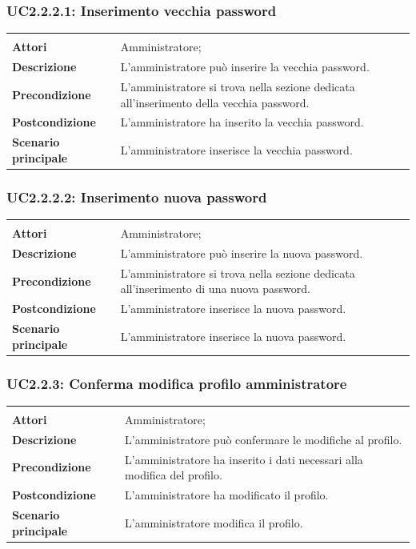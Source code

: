 \subsubsection{UC2.2.2.1: Inserimento vecchia password}
\label{UC2.2.2.1}
\begin{longtable}{l|p{10cm}}
\hline
&\\
\textbf{Attori} & Amministratore;\\[7pt]
\textbf{Descrizione} & L'amministratore può inserire la vecchia password.\\[7pt]
\textbf{Precondizione} & L'amministratore si trova nella sezione dedicata all'inserimento della vecchia password.\\[7pt]
\textbf{Postcondizione} & L'amministratore ha inserito la vecchia password.\\[7pt]
\textbf{Scenario principale} & L'amministratore inserisce la vecchia password.\\[7pt]\hline
\end{longtable}

\subsubsection{UC2.2.2.2: Inserimento nuova password}
\label{UC2.2.2.2}
\begin{longtable}{l|p{10cm}}
\hline
&\\
\textbf{Attori} & Amministratore;\\[7pt]
\textbf{Descrizione} & L'amministratore può inserire la nuova password.\\[7pt]
\textbf{Precondizione} & L'amministratore si trova nella sezione dedicata all'inserimento di una nuova password.\\[7pt]
\textbf{Postcondizione} & L'amministratore inserisce la nuova password.\\[7pt]
\textbf{Scenario principale} & L'amministratore inserisce la nuova password.\\[7pt]\hline
\end{longtable}

\subsubsection{UC2.2.3: Conferma modifica profilo amministratore}
\label{UC2.2.3}
\begin{longtable}{l|p{10cm}}
\hline
&\\
\textbf{Attori} & Amministratore;\\[7pt]
\textbf{Descrizione} & L'amministratore può confermare le modifiche al profilo.\\[7pt]
\textbf{Precondizione} & L'amministratore ha inserito i dati necessari alla modifica del profilo.\\[7pt]
\textbf{Postcondizione} & L'amministratore ha modificato il profilo.\\[7pt]
\textbf{Scenario principale} & L'amministratore modifica il profilo.\\[7pt]\hline
\end{longtable}

